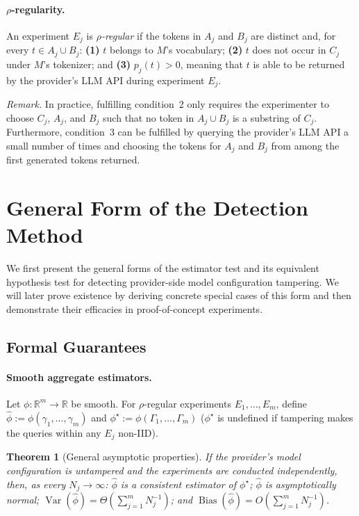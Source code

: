\documentclass{article}
\newtheorem{theorem}{Theorem}
\begin{document}
\paragraph{$\rho$-regularity.}
An experiment $E_j$ is \emph{$\rho$-regular} if the tokens in $A_j$ and $B_j$
are distinct and, for every $t\in A_j\cup B_j$: \textbf{(1)} $t$ belongs to $M$'s
vocabulary; \textbf{(2)} $t$ does not occur in $C_j$ under $M$'s tokenizer; and
\textbf{(3)} $p_j(t)>0$, meaning that $t$ is able to be returned by the provider's LLM
API during experiment $E_j$.

\emph{Remark.} In practice, fulfilling condition~2 only requires the experimenter to choose
$C_j$, $A_j$, and $B_j$ such that no token in $A_j\cup B_j$ is a substring of
$C_j$. Furthermore, condition~3 can be fulfilled by querying the provider's LLM
API a small number of times and choosing the tokens for $A_j$ and $B_j$ from
among the first generated tokens returned.

\section{General Form of the Detection Method}
\label{sec:general-detection-method}
We first present the general forms of the estimator test and its equivalent hypothesis test for detecting provider-side model configuration tampering. We will later prove existence by deriving concrete special cases of this form and then demonstrate their efficacies in proof-of-concept experiments.

\subsection{Formal Guarantees}

\paragraph{Smooth aggregate estimators.}
Let $\phi:\mathbb{R}^m\to\mathbb{R}$ be smooth. For $\rho$-regular
experiments $E_1,\ldots,E_m$, define
$\widehat{\phi}:=\phi(\gamma_1,\ldots,\gamma_m)$ and
$\phi^\star:=\phi(\Gamma_1,\ldots,\Gamma_m)$ ($\phi^\star$ is undefined if
tampering makes the queries within any $E_j$ non-IID).

\begin{theorem}[General asymptotic properties]
\label{thm:general-asymptotic-properties}
If the provider's model configuration is untampered and the experiments are
conducted independently, then, as every $N_j\to\infty$:
$\widehat{\phi}$ is a consistent estimator of $\phi^\star$;
$\widehat{\phi}$ is asymptotically normal;
$\operatorname{Var}(\widehat{\phi})=\Theta(\sum_{j=1}^m N_j^{-1})$; and
$\operatorname{Bias}(\widehat{\phi})=O(\sum_{j=1}^m N_j^{-1})$.
\end{theorem}
\end{document}
